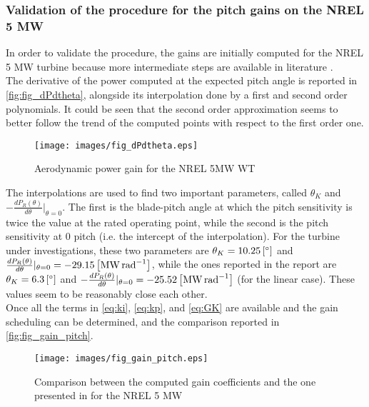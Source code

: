\subsubsection{Validation of the procedure for the pitch gains on the NREL 5 MW}\label{subsec:gain_schdeuling_NREL5MW}
In order to validate the procedure, the gains are initially computed for the NREL 5 MW turbine because more intermediate steps are available in literature \cite{NREL_5MW_reference}.\\
The derivative of the power computed at the expected pitch angle is  reported in \autoref{fig:fig_dPdtheta}, alongside its interpolation done by a first and second order polynomials. It could be seen that the second order approximation seems to better follow the trend of the computed points with respect to the first order one. 
\begin{figure}[htb]
    \centering
    \texttt{[image: images/fig\_dPdtheta.eps]}
    \caption{Aerodynamic power gain for the NREL 5MW WT}
    \label{fig:fig_dPdtheta}
\end{figure}

The interpolations are used to find two important parameters, called $\theta_{K}$ and  $-\frac{dP_R(\theta)}{d\theta}\vert_{\theta=0}$. The first is the blade-pitch angle at which the pitch sensitivity is twice the value at the rated operating point, while the second is the pitch sensitivity at 0 pitch (i.e. the intercept of the interpolation). For the turbine under investigations, these two parameters are $\theta_K=10.25 \left[\si{\degree}\right]$ and  $\frac{dP_R(\theta)}{d\theta}\vert_{\theta=0} = -29.15 \left[\si{\mega\watt\per\radian}\right]$, while the ones reported in the report are $\theta_K=6.3 \left[\si{\degree}\right]$ and  $-\frac{dP_R(\theta)}{d\theta}\vert_{\theta=0} = -25.52\left[\si{\mega\watt\per\radian}\right]$ (for the linear case). These values seem to be reasonably close each other.\\ 
Once all the terms in \autoref{eq:ki}, \ref{eq:kp}, and \ref{eq:GK} are available and the gain scheduling can be determined, and the comparison reported in \autoref{fig:fig_gain_pitch}.
\begin{figure}[htb]
    \centering
    \texttt{[image: images/fig\_gain\_pitch.eps]}
    \caption{Comparison between the computed gain coefficients and the one presented in \cite{NREL_5MW_reference} for the NREL 5 MW}
    \label{fig:fig_gain_pitch}
\end{figure}



